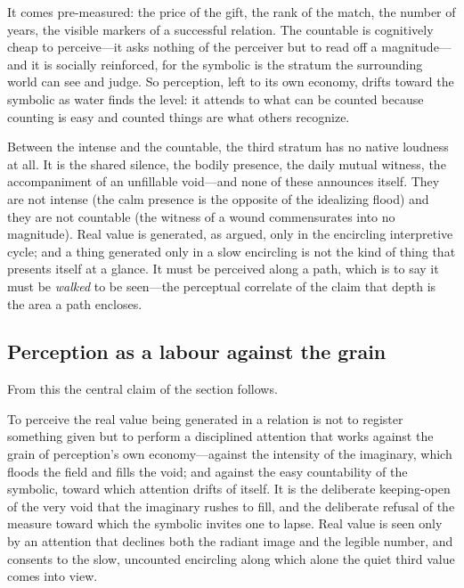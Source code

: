  It comes pre-measured: the price of the gift, the rank of the match, the number of years, the visible markers of a successful relation. The countable is cognitively cheap to perceive---it asks nothing of the perceiver but to read off a magnitude---and it is socially reinforced, for the symbolic is the stratum the surrounding world can see and judge. So perception, left to its own economy, drifts toward the symbolic as water finds the level: it attends to what can be counted because counting is easy and counted things are what others recognize.

Between the intense and the countable, the third stratum has no native loudness at all.  It is the shared silence, the bodily presence, the daily mutual witness, the accompaniment of an unfillable void---and none of these announces itself. They are not intense (the calm presence is the opposite of the idealizing flood) and they are not countable (the witness of a wound commensurates into no magnitude). Real value is generated, as  argued, only in the encircling interpretive cycle; and a thing generated only in a slow encircling is not the kind of thing that presents itself at a glance. It must be perceived along a path, which is to say it must be \emph{walked} to be seen---the perceptual correlate of the claim that depth is the area a path encloses.

\subsection{Perception as a labour against the grain}
\label{p09:sec:perception-labour}

From this the central claim of the section follows.

\begin{claim}
To perceive the real value being generated in a relation is not to register something given but to perform a disciplined attention that works against the grain of perception's own economy---against the intensity of the imaginary, which floods the field and fills the void; and against the easy countability of the symbolic, toward which attention drifts of itself. It is the deliberate keeping-open of the very void that the imaginary rushes to fill, and the deliberate refusal of the measure toward which the symbolic invites one to lapse. Real value is seen only by an attention that declines both the radiant image and the legible number, and consents to the slow, uncounted encircling along which alone the quiet third value comes into view.
\end{claim}

